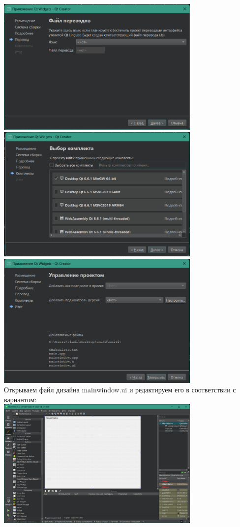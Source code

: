 \documentclass[a4paper,14pt]{extarticle}
\begin{document}
\begin{enumerate}[1.]
    \includegraphics[width=100mm]{qtfS4}\\
    \includegraphics[width=100mm]{qtfS5}\\
    \includegraphics[width=100mm]{qtfS6}\\
    Открываем файл дизайна mainwindow.ui и редактируем его в соответствии с вариантом:\\
    \includegraphics[width=100mm]{qtfS7}\\

\end{enumerate}
\end{document}
